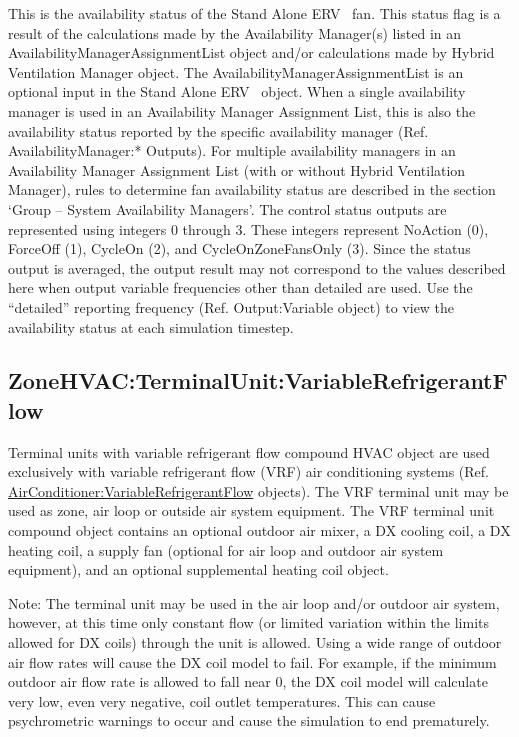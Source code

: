 This is the availability status of the Stand Alone ERV~ fan. This status flag is a result of the calculations made by the Availability Manager(s) listed in an AvailabilityManagerAssignmentList object and/or calculations made by Hybrid Ventilation Manager object. The AvailabilityManagerAssignmentList is an optional input in the Stand Alone ERV~ object. When a single availability manager is used in an Availability Manager Assignment List, this is also the availability status reported by the specific availability manager (Ref. AvailabilityManager:* Outputs). For multiple availability managers in an Availability Manager Assignment List (with or without Hybrid Ventilation Manager), rules to determine fan availability status are described in the section `Group -- System Availability Managers'. The control status outputs are represented using integers 0 through 3. These integers represent NoAction (0), ForceOff (1), CycleOn (2), and CycleOnZoneFansOnly (3). Since the status output is averaged, the output result may not correspond to the values described here when output variable frequencies other than detailed are used. Use the ``detailed'' reporting frequency (Ref. Output:Variable object) to view the availability status at each simulation timestep.

\subsection{ZoneHVAC:TerminalUnit:VariableRefrigerantFlow}\label{zonehvacterminalunitvariablerefrigerantflow}

Terminal units with variable refrigerant flow compound HVAC object are used exclusively with variable refrigerant flow (VRF) air conditioning systems (Ref. \hyperref[airconditionervariablerefrigerantflow]{AirConditioner:VariableRefrigerantFlow} objects). The VRF terminal unit may be used as zone, air loop or outside air system equipment. The VRF terminal unit compound object contains an optional outdoor air mixer, a DX cooling coil, a DX heating coil, a supply fan (optional for air loop and outdoor air system equipment), and an optional supplemental heating coil object.

\begin{callout}
Note: The terminal unit may be used in the air loop and/or outdoor air system, however, at this time only constant flow (or limited variation within the limits allowed for DX coils) through the unit is allowed. Using a wide range of outdoor air flow rates will cause the DX coil model to fail. For example, if the minimum outdoor air flow rate is allowed to fall near 0, the DX coil model will calculate very low, even very negative, coil outlet temperatures. This can cause psychrometric warnings to occur and cause the simulation to end prematurely.
\end{callout} 

